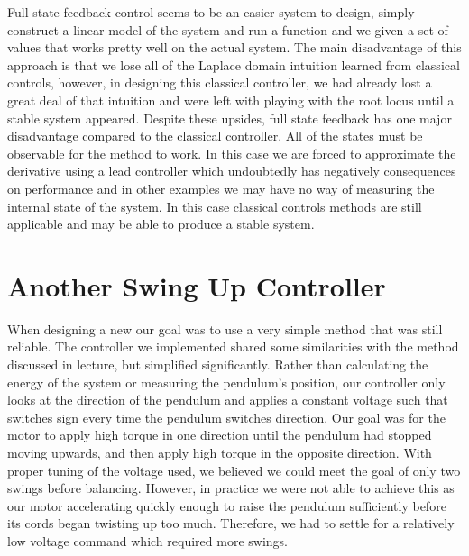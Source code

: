 \documentclass{article}
\theoremstyle{plain}
\theoremstyle{definition}
\theoremstyle{remark}
\begin{document}
Full state feedback control seems to be an easier system to design, simply construct a linear model of the system and run a function and we given a set of values that works pretty well on the actual system.  The main disadvantage of this approach is that we lose all of the Laplace domain intuition learned from classical controls, however, in designing this classical controller, we had already lost a great deal of that intuition and were left with playing with the root locus until a stable system appeared.  Despite these upsides, full state feedback has one major disadvantage compared to the classical controller.  All of the states must be observable for the method to work.  In this case we are forced to approximate the derivative using a lead controller which undoubtedly has negatively consequences on performance and in other examples we may have no way of measuring the internal state of the system.  In this case classical controls methods are still applicable and may be able to produce a stable system. 



\clearpage
\section{Another Swing Up Controller}
When designing a new our goal was to use a very simple method that was still reliable. The controller we implemented shared some similarities with the method discussed in lecture, but simplified significantly. Rather than calculating the energy of the system or measuring the pendulum's position, our controller only looks at the direction of the pendulum and applies a constant voltage such that switches sign every time the pendulum switches direction. Our goal was for the motor to apply high torque in one direction until the pendulum had stopped moving upwards, and then apply high torque in the opposite direction. With proper tuning of the voltage used, we believed we could meet the goal of only two swings before balancing. However, in practice we were not able to achieve this as our motor accelerating quickly enough to raise the pendulum sufficiently before its cords began twisting up too much. Therefore, we had to settle for a relatively low voltage command which required more swings. \\
\end{document}

